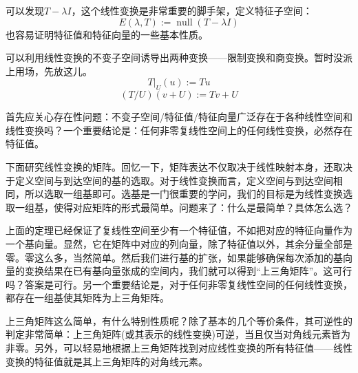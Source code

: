 \documentclass{tufte-book}
\begin{document}
可以发现\(T-\lambda I\)，这个线性变换是非常重要的脚手架，定义特征子空间：
\[E(\lambda,T) := \operatorname{null}(T-\lambda I)\]
也容易证明特征值和特征向量的一些基本性质。
\par 可以利用线性变换的不变子空间诱导出两种变换——限制变换和商变换。暂时没派上用场，先放这儿。
\[T\vert_U(u) := Tu\]
\[(T/U)(v+U):=Tv+U\]
\par 首先应关心存在性问题：不变子空间/特征值/特征向量广泛存在于各种线性空间和线性变换吗？一个重要结论是：\textcolor{BrickRed}{任何非零}\textcolor{BrickRed}{复线性空间上的任何线性变换，必然存在特征值。}
\par 下面研究线性变换的矩阵。回忆一下，矩阵表达不仅取决于线性映射本身，还取决于定义空间与到达空间的基的选取。对于线性变换而言，定义空间与到达空间相同，所以选取一组基即可。选基是一门很重要的学问，我们的目标是为线性变换选取一组基，使得对应矩阵的形式最简单。问题来了：什么是最简单？具体怎么选？
\par 上面的定理已经保证了复线性空间至少有一个特征值，不如把对应的特征向量作为一个基向量。显然，它在矩阵中对应的列向量，除了特征值以外，其余分量全部是零。零这么多，当然简单。然后我们进行基的扩张，如果能够确保每次添加的基向量的变换结果在已有基向量张成的空间内，我们就可以得到“上三角矩阵”。这可行吗？答案是可行。另一个重要结论是，\textcolor{BrickRed}{对于任何非零复线性空间的任何线性变换，都存在一组基使其矩阵为上三角矩阵。}
\par 上三角矩阵这么简单，有什么特别性质呢？除了基本的几个等价条件，其可逆性的判定非常简单：\textcolor{BrickRed}{上三角矩阵(或其表示的线性变换)可逆，当且仅当对角线元素皆为非零。}另外，可以轻易地根据上三角矩阵找到对应线性变换的所有特征值——\textcolor{BrickRed}{线性变换的特征值就是其上三角矩阵的对角线元素。}
\end{document}
